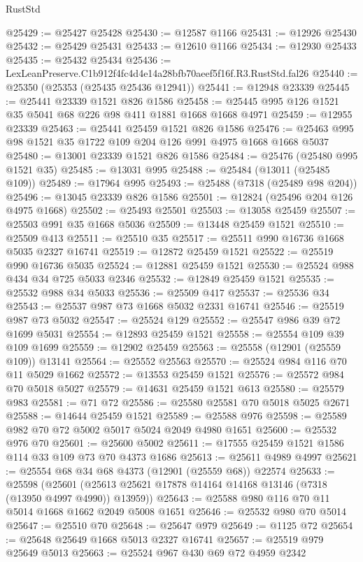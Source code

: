 \begin{lexlean}{RustStd}
\begin{coremodule}
@25429 := @25427 @25428
@25430 := @12587 @1166
@25431 := @12926 @25430
@25432 := @25429 @25431
@25433 := @12610 @1166
@25434 := @12930 @25433
@25435 := @25432 @25434
@25436 := LexLeanPreserve.C1b912f4fc4d4e14a28bfb70aeef5f16f.R3.RustStd.fal26
@25440 := @25350 (@25353 (@25435 @25436 @12941))
@25441 := @12948 @23339
@25445 := @25441 @23339 @1521 @826 @1586
@25458 := @25445 @995 @126 @1521 @35 @5041 @68 @226 @98 @411 @1881 @1668 @1668 @4971
@25459 := @12955 @23339
@25463 := @25441 @25459 @1521 @826 @1586
@25476 := @25463 @995 @98 @1521 @35 @1722 @109 @204 @126 @991 @4975 @1668 @1668 @5037
@25480 := @13001 @23339 @1521 @826 @1586
@25484 := @25476 (@25480 @995 @1521 @35)
@25485 := @13031 @995
@25488 := @25484 (@13011 (@25485 @109))
@25489 := @17964 @995
@25493 := @25488 (@7318 (@25489 @98 @204))
@25496 := @13045 @23339 @826 @1586
@25501 := @12824 (@25496 @204 @126 @4975 @1668)
@25502 := @25493 @25501
@25503 := @13058 @25459
@25507 := @25503 @991 @35 @1668 @5036
@25509 := @13448 @25459 @1521
@25510 := @25509 @413
@25511 := @25510 @35
@25517 := @25511 @990 @16736 @1668 @5035 @2327 @16741
@25519 := @12872 @25459 @1521
@25522 := @25519 @990 @16736 @5035
@25524 := @12881 @25459 @1521
@25530 := @25524 @988 @434 @34 @725 @5033 @2346
@25532 := @12849 @25459 @1521
@25535 := @25532 @988 @34 @5033
@25536 := @25509 @417
@25537 := @25536 @34
@25543 := @25537 @987 @73 @1668 @5032 @2331 @16741
@25546 := @25519 @987 @73 @5032
@25547 := @25524 @129
@25552 := @25547 @986 @39 @72 @1699 @5031
@25554 := @12893 @25459 @1521
@25558 := @25554 @109 @39 @109 @1699
@25559 := @12902 @25459
@25563 := @25558 (@12901 (@25559 @109)) @13141
@25564 := @25552 @25563
@25570 := @25524 @984 @116 @70 @11 @5029 @1662
@25572 := @13553 @25459 @1521
@25576 := @25572 @984 @70 @5018 @5027
@25579 := @14631 @25459 @1521 @613
@25580 := @25579 @983
@25581 := @71 @72
@25586 := @25580 @25581 @70 @5018 @5025 @2671
@25588 := @14644 @25459 @1521
@25589 := @25588 @976
@25598 := @25589 @982 @70 @72 @5002 @5017 @5024 @2049 @4980 @1651
@25600 := @25532 @976 @70
@25601 := @25600 @5002
@25611 := @17555 @25459 @1521 @1586 @114 @33 @109 @73 @70 @4373 @1686
@25613 := @25611 @4989 @4997
@25621 := @25554 @68 @34 @68 @4373 (@12901 (@25559 @68)) @22574
@25633 := @25598
    (@25601 (@25613 @25621 @17878 @14164 @14168 @13146 (@7318 (@13950 @4997 @4990)) @13959))
@25643 := @25588 @980 @116 @70 @11 @5014 @1668 @1662 @2049 @5008 @1651
@25646 := @25532 @980 @70 @5014
@25647 := @25510 @70
@25648 := @25647 @979
@25649 := @1125 @72
@25654 := @25648 @25649 @1668 @5013 @2327 @16741
@25657 := @25519 @979 @25649 @5013
@25663 := @25524 @967 @430 @69 @72 @4959 @2342

\end{coremodule}
\end{lexlean}
